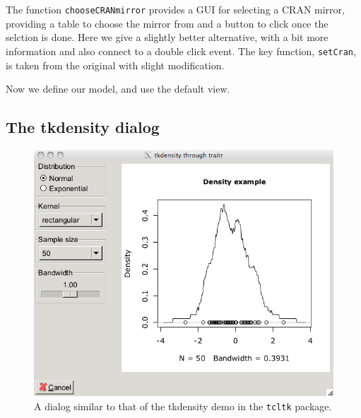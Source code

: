 \documentclass{article}
\newcommand{\code}[1]{\texttt{#1}} %
\newcommand{\pkg}[1]{\texttt{#1}}
\begin{document}
The function \code{chooseCRANmirror} provides a GUI for selecting a
CRAN mirror, providing a table to choose the mirror from and a button
to click once the selction is done. Here we give a slightly better
alternative, with a bit more information and also connect to a double
click event. The
key function, \code{setCran}, is taken from the original with slight modification.
\begin{Schunk}
\end{Schunk}
Now we define our model, and use the default view.
\begin{Schunk}
\end{Schunk}


\subsection{The tkdensity dialog}
\label{sec:tkdensity-dialog}

\begin{figure}
  \centering
  \includegraphics[width=.6\textwidth]{tkdensity-traitr}
  \caption{A dialog similar to that of the tkdensity demo in the
    \pkg{tcltk} package.}
  \label{fig:tkdensity-traitr}
\end{figure}
\end{document}
